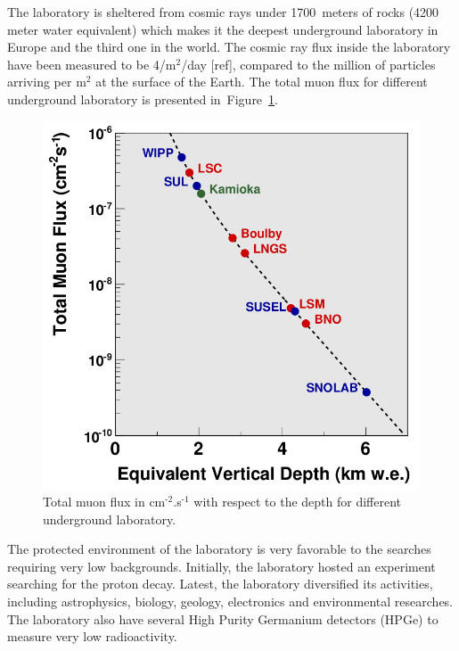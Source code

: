 \documentclass[main.tex]{subfiles}
\begin{document}
\NI The laboratory is sheltered from cosmic rays under 1700~meters of rocks (4200 meter water equivalent) which makes it the deepest underground laboratory in Europe and the third one in the world. The cosmic ray flux inside the laboratory have been measured to be 4/m$^\text{2}$/day [ref], compared to the million of particles arriving per m$^\text{2}$ at the surface of the Earth. The total muon flux for different underground laboratory is presented in~Figure~\ref{LabDeepth}.
 

\begin{figure}[h!]
\begin{center}
\includegraphics[scale=0.30]{pictures/Chap3/lab_depth.png}
\caption{Total muon flux in cm$^{\text{-2}}$.s$^{\text{-1}}$ with respect to the depth for different underground laboratory.}
\label{LabDeepth}
\end{center}
\end{figure}


\NI The protected environment of the laboratory is very favorable to the searches requiring very low backgrounds. Initially, the laboratory hosted an experiment searching for the proton decay. Latest, the laboratory diversified its activities, including astrophysics, biology, geology, electronics and environmental researches. The laboratory also have several High Purity Germanium detectors (HPGe) to measure very low radioactivity. 
\end{document}
